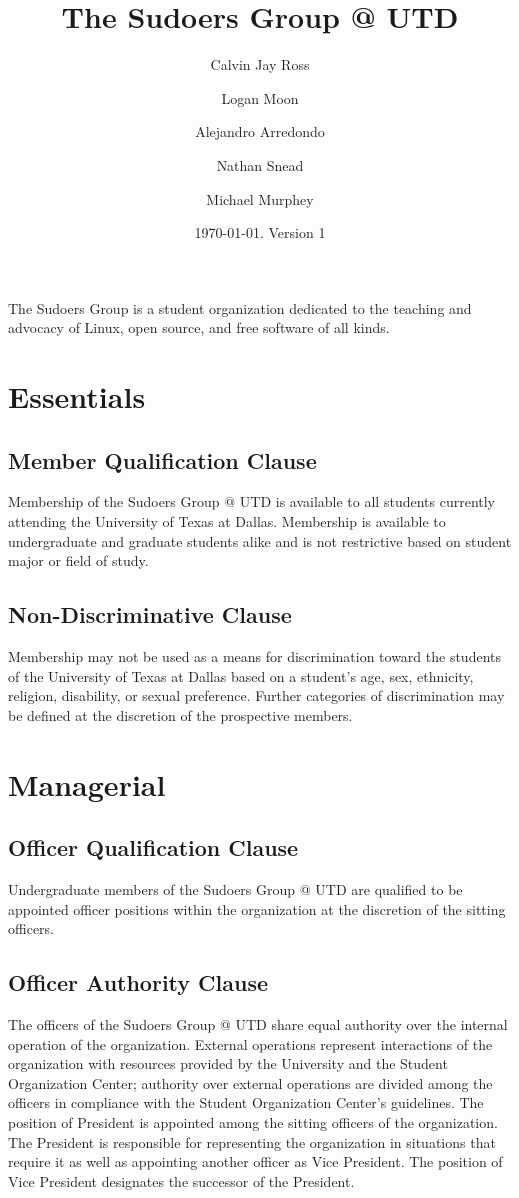 \documentclass{constitution}
\title{The Sudoers Group {@} UTD}
\author{Calvin Jay Ross \and Logan Moon \and Alejandro Arredondo \and Nathan Snead \and Michael Murphey}
\date{\today. Version 1}
\begin{document}
\maketitle
\begin{center}
  The Sudoers Group is a student organization dedicated to the teaching and advocacy of Linux, open source, and free software of all kinds.
\end{center}

\section{Essentials}

\subsection{Member Qualification Clause}
Membership of the Sudoers Group @ UTD is available to all students currently attending the University of Texas at Dallas.
Membership is available to undergraduate and graduate students alike and is not restrictive based on student major or field of study.

\subsection{Non-Discriminative Clause}
Membership may not be used as a means for discrimination toward the students of the University of Texas at Dallas based on a student's age, sex, ethnicity, religion, disability, or sexual preference.
Further categories of discrimination may be defined at the discretion of the prospective members.

\section{Managerial}

\subsection{Officer Qualification Clause}
Undergraduate members of the Sudoers Group @ UTD are qualified to be appointed officer positions within the organization at the discretion of the sitting officers.

\subsection{Officer Authority Clause}
The officers of the Sudoers Group @ UTD share equal authority over the internal operation of the organization.
External operations represent interactions of the organization with resources provided by the University and the Student Organization Center; authority over external operations are divided among the officers in compliance with the Student Organization Center's guidelines.
The position of President is appointed among the sitting officers of the organization.
The President is responsible for representing the organization in situations that require it as well as appointing another officer as Vice President.
The position of Vice President designates the successor of the President.
\end{document}

